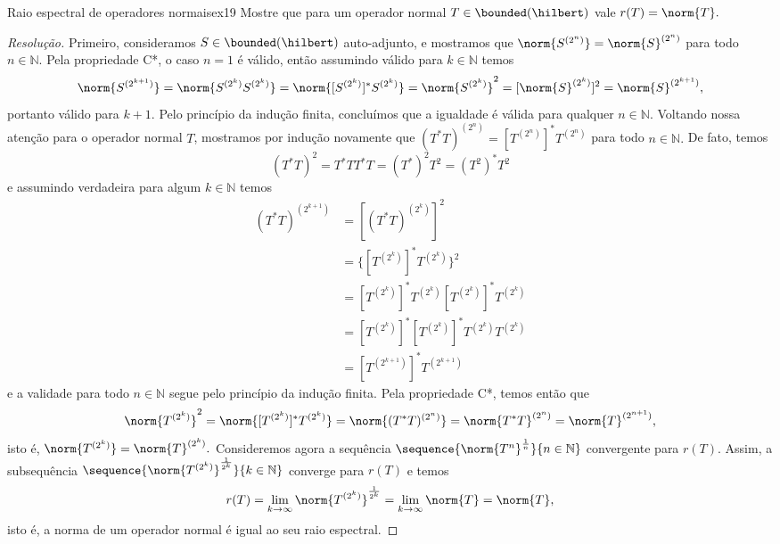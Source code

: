 \begin{exercício}{Raio espectral de operadores normais}{ex19}
  Mostre que para um operador normal \(T \in \bounded(\hilbert)\) vale \(r(T) = \norm{T}.\)
\end{exercício}
\begin{proof}[Resolução]
    Primeiro, consideramos \(S \in \bounded(\hilbert)\) auto-adjunto, e mostramos que \(\norm{S^{(2^n)}} = \norm{S}^{(2^n)}\) para todo \(n \in \mathbb{N}\). Pela propriedade C*, o caso \(n = 1\) é válido, então assumindo válido para \(k \in \mathbb{N}\) temos
  \begin{equation*}
    \norm{S^{(2^{k+1})}} = \norm{S^{(2^k)} S^{(2^k)}} = \norm{[S^{(2^k)}]^* S^{(2^k)}} = \norm{S^{(2^k)}}^2 = [\norm{S}^{(2^k)}]^2 = \norm{S}^{(2^{k+1})},
  \end{equation*}
  portanto válido para \(k + 1.\) Pelo princípio da indução finita, concluímos que a igualdade é válida para qualquer \(n \in \mathbb{N}.\)
  Voltando nossa atenção para o operador normal \(T\), mostramos por indução novamente que \((T^*T)^{(2^n)} = \left[T^{(2^n)}\right]^* T^{(2^n)}\) para todo \(n \in \mathbb{N}.\) De fato, temos
  \begin{equation*}
    (T^*T)^2 = T^*T T^*T = (T^*)^2 T^2 = (T^2)^*T^2
  \end{equation*}
  e assumindo verdadeira para algum \(k \in \mathbb{N}\) temos
  \begin{align*}
    (T^*T)^{(2^{k+1})} &= [(T^*T)^{(2^k)}]^2\\
                       &= \{[T^{(2^k)}]^*T^{(2^k)}\}^2\\
                       &= [T^{(2^k)}]^*T^{(2^k)}[T^{(2^k)}]^*T^{(2^k)}\\
                       &= [T^{(2^k)}]^*[T^{(2^k)}]^*T^{(2^k)}T^{(2^k)}\\
                       &= [T^{(2^{k+1})}]^*T^{(2^{k+1})}
  \end{align*}
  e a validade para todo \(n \in \mathbb{N}\) segue pelo princípio da indução finita. Pela propriedade C*, temos então que
  \begin{equation*}
    \norm{T^{(2^k)}}^2 = \norm{[T^{(2^k)}]^*T^{(2^k)}} = \norm{(T^*T)^{(2^n)}} = \norm{T^*T}^{(2^n)} = \norm{T}^{(2^{n+1})},
  \end{equation*}
  isto é, \(\norm{T^{(2^k)}} = \norm{T}^{(2^k)}.\)
  Consideremos agora a sequência \(\sequence{\norm{T^n}^{\frac1n}}{n\in \mathbb{N}}\) convergente para \(r(T)\). Assim, a subsequência \(\sequence{\norm{T^{(2^k)}}^{\frac{1}{2^k}}}{k \in \mathbb{N}}\) converge para \(r(T)\) e temos
  \begin{equation*}
    r(T) = \lim_{k \to \infty}{\norm{T^{(2^k)}}^{\frac1{2^k}}} = \lim_{k \to \infty}{\norm{T}} = \norm{T},
  \end{equation*}
  isto é, a norma de um operador normal é igual ao seu raio espectral.
\end{proof}
